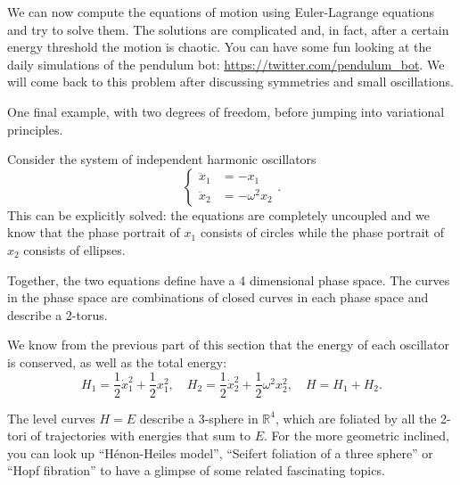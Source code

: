 \documentclass[english,fontsize=11pt,paper=a5,oneside]{scrbook}
\theoremstyle{definition}
\newenvironment{example}
  {\pushQED{\qed}\renewcommand{\qedsymbol}{$\lozenge$}\examplex}
  {\popQED\endexamplex}
\begin{document}
\begin{example}[Double pendulum]
    We can now compute the equations of motion using Euler-Lagrange equations and try to solve them.
    The solutions are complicated and, in fact, after a certain energy threshold the motion is chaotic.
    You can have some fun looking at the daily simulations of the pendulum bot: \url{https://twitter.com/pendulum_bot}. 
    We will come back to this problem after discussing symmetries and small oscillations.
\end{example}

One final example, with two degrees of freedom, before jumping into variational principles.

\begin{example}[Lissajous Figures]\label{exa:lissajous}
Consider the system of independent harmonic oscillators
\begin{equation}
    \left\lbrace
    \begin{aligned}
        \ddot x_1 &= -x_1\\
        \ddot x_2 &= -\omega^2 x_2
    \end{aligned}
    \right..
\end{equation}
This can be explicitly solved: the equations are completely uncoupled and we know that the phase portrait of $x_1$ consists of circles while the phase portrait of $x_2$ consists of ellipses.

Together, the two equations define have a 4 dimensional phase space. The curves in the phase space are combinations of closed curves in each phase space and describe a 2-torus.

We know from the previous part of this section that the energy of each oscillator is conserved, as well as the total energy:
\begin{equation}
    H_1 = \frac12\dot x_1^2 + \frac12 x_1^2, \quad
    H_2 = \frac12\dot x_2^2 + \frac12 \omega^2 x_2^2, \quad
    H = H_1 + H_2.
\end{equation}

The level curves $H=E$ describe a 3-sphere in $\mathbb{R}^4$, which are foliated by all the 2-tori of trajectories with energies that sum to $E$. For the more geometric inclined, you can look up ``H\'enon-Heiles model'', ``Seifert foliation of a three sphere'' or ``Hopf fibration'' to have a glimpse of some related fascinating topics.


\end{example}
\end{document}
